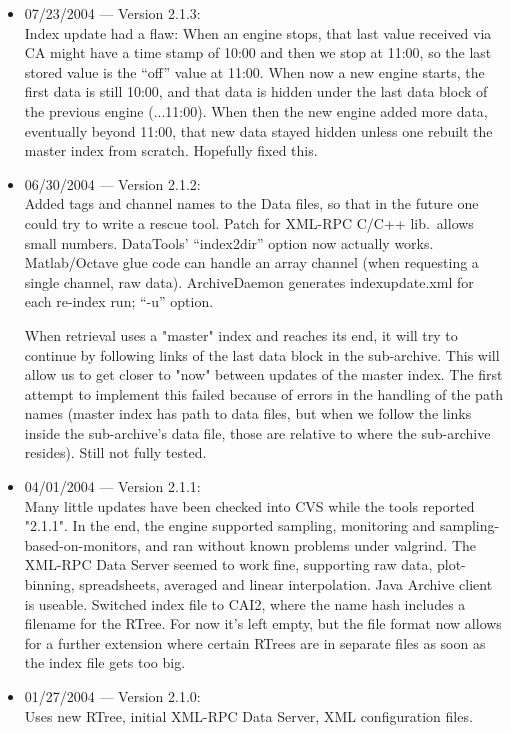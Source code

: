 \begin{itemize}
\item 07/23/2004 --- Version 2.1.3:\\
Index update had a flaw:
When an engine stops, that last value received via CA
might have a time stamp of 10:00 and then we stop
at 11:00, so the last stored value is the ``off'' value
at 11:00.
When now a new engine starts, the first data is still
10:00, and that data is hidden under the last data block
of the previous engine (...11:00).
When then the new engine added more data, eventually
beyond 11:00, that new data stayed hidden unless
one rebuilt the master index from scratch.
Hopefully fixed this.

\item 06/30/2004 --- Version 2.1.2:\\
Added tags and channel names to the Data files,
so that in the future one could try to write
a rescue tool.
Patch for XML-RPC C/C++ lib.\ allows small numbers.
DataTools' ``index2dir'' option now actually works.
Matlab/Octave glue code can handle an array channel
(when requesting a single channel, raw data).
ArchiveDaemon generates indexupdate.xml for each re-index run;
``-u'' option.

When retrieval uses a "master" index and reaches
its end, it will try to continue by following
links of the last data block in the sub-archive.
This will allow us to get closer to "now" between
updates of the master index.
The first attempt to implement this failed because
of errors in the handling of the path names
(master index has path to data files, but when
we follow the links inside the sub-archive's data
file, those are relative to where the sub-archive resides).
Still not fully tested.

\item 04/01/2004 --- Version 2.1.1:\\
Many little updates have been checked into CVS
while the tools reported "2.1.1".
In the end, the engine supported sampling, monitoring
and sampling-based-on-monitors, and ran without known problems
under valgrind.
The XML-RPC Data Server seemed to work fine, supporting
raw data, plot-binning, spreadsheets, averaged and linear interpolation.
Java Archive client is useable.
Switched index file to CAI2, where the name hash includes a filename
for the RTree. For now it's left empty, but the file format now
allows for a further extension where certain RTrees are in separate
files as soon as the index file gets too big.

\item 01/27/2004 --- Version 2.1.0:\\
Uses new RTree, initial XML-RPC Data Server, XML configuration files.


\end{itemize}
